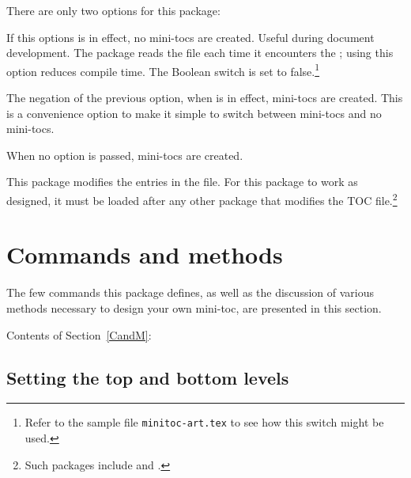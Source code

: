 \documentclass[10pt]{article}
\newcommand{\insMinitoci}[2][]{%
  \begin{center}#2
  \begin{minipage}[c]{0.8\linewidth}
  Contents of Section~\ref*{CandM}: \nameref*{CandM}
  \par\kern2pt
  \insertminitoc[#1]
  \end{minipage}
  \end{center}
}
\begin{document}
There are only two options for this package:
\begin{aebDescript}
    \item[\opt{nomintocs}] If this options is in effect, no mini-tocs are
        created. Useful during document development. The 
        package reads the  file each time it encounters the
        ; using this option reduces compile time. The
        Boolean switch  is set to false.\footnote{Refer
        to the sample file \texttt{minitoc-art.tex} to see how this switch
        might be used.}
    \item[\opt{!nominitocs}] The negation of the previous option, when
         is in effect, mini-tocs are created. This is a
        convenience option to make it simple to switch between mini-tocs and
        no mini-tocs.
\end{aebDescript}
When no option is passed, mini-tocs are created.

\newtopic\noindent{}%
This package modifies the entries in the  file. For this
package to work as designed, it must be loaded after any other package that
modifies the TOC file.\footnote{Such packages include  and .}

\section{Commands and methods}

The few commands this package defines, as well as the discussion of various
methods necessary to design your own mini-toc, are presented in this section.

\insMinitoci{\minitocFmt}

\subsection[\protect\miniorfulltoc{\protect\textbf}{Setting the top and bottom levels}]{Setting the top and bottom levels}

\end{document}
